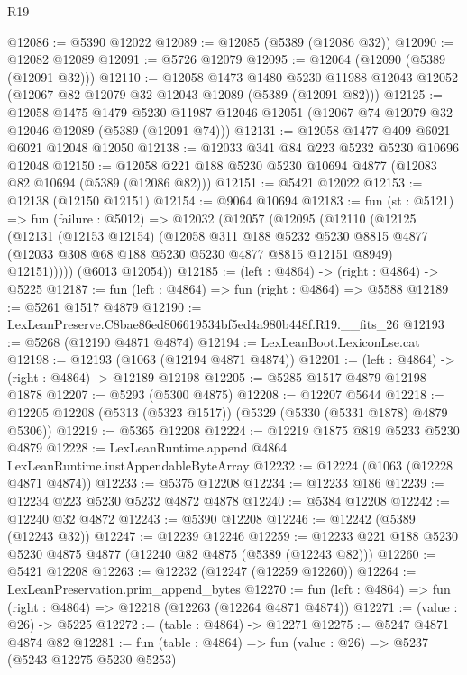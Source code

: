 \begin{lexlean}{R19}
\begin{coremodule}
@12086 := @5390 @12022
@12089 := @12085 (@5389 (@12086 @32))
@12090 := @12082 @12089
@12091 := @5726 @12079
@12095 := @12064 (@12090 (@5389 (@12091 @32)))
@12110 := @12058
    @1473
    @1480
    @5230
    @11988
    @12043
    @12052
    (@12067 @82 @12079 @32 @12043 @12089 (@5389 (@12091 @82)))
@12125 := @12058
    @1475
    @1479
    @5230
    @11987
    @12046
    @12051
    (@12067 @74 @12079 @32 @12046 @12089 (@5389 (@12091 @74)))
@12131 := @12058 @1477 @409 @6021 @6021 @12048 @12050
@12138 := @12033 @341 @84 @223 @5232 @5230 @10696 @12048
@12150 := @12058 @221 @188 @5230 @5230 @10694 @4877 (@12083 @82 @10694 (@5389 (@12086 @82)))
@12151 := @5421 @12022
@12153 := @12138 (@12150 @12151)
@12154 := @9064 @10694
@12183 := fun (st : @5121) =>
  fun (failure : @5012) =>
  @12032
    (@12057
      (@12095
        (@12110
          (@12125
            (@12131
              (@12153 @12154)
              (@12058
                @311
                @188
                @5232
                @5230
                @8815
                @4877
                (@12033 @308 @68 @188 @5230 @5230 @4877 @8815 @12151 @8949)
                @12151)))))
      (@6013 @12054))
@12185 := (left : @4864) -> (right : @4864) -> @5225
@12187 := fun (left : @4864) => fun (right : @4864) => @5588
@12189 := @5261 @1517 @4879
@12190 := LexLeanPreserve.C8bae86ed806619534bf5ed4a980b448f.R19.__fits_26
@12193 := @5268 (@12190 @4871 @4874)
@12194 := LexLeanBoot.LexiconLse.cat
@12198 := @12193 (@1063 (@12194 @4871 @4874))
@12201 := (left : @4864) -> (right : @4864) -> @12189 @12198
@12205 := @5285 @1517 @4879 @12198 @1878
@12207 := @5293 (@5300 @4875)
@12208 := @12207 @5644
@12218 := @12205 @12208 (@5313 (@5323 @1517)) (@5329 (@5330 (@5331 @1878) @4879 @5306))
@12219 := @5365 @12208
@12224 := @12219 @1875 @819 @5233 @5230 @4879
@12228 := LexLeanRuntime.append @4864 LexLeanRuntime.instAppendableByteArray
@12232 := @12224 (@1063 (@12228 @4871 @4874))
@12233 := @5375 @12208
@12234 := @12233 @186
@12239 := @12234 @223 @5230 @5232 @4872 @4878
@12240 := @5384 @12208
@12242 := @12240 @32 @4872
@12243 := @5390 @12208
@12246 := @12242 (@5389 (@12243 @32))
@12247 := @12239 @12246
@12259 := @12233 @221 @188 @5230 @5230 @4875 @4877 (@12240 @82 @4875 (@5389 (@12243 @82)))
@12260 := @5421 @12208
@12263 := @12232 (@12247 (@12259 @12260))
@12264 := LexLeanPreservation.prim_append_bytes
@12270 := fun (left : @4864) => fun (right : @4864) => @12218 (@12263 (@12264 @4871 @4874))
@12271 := (value : @26) -> @5225
@12272 := (table : @4864) -> @12271
@12275 := @5247 @4871 @4874 @82
@12281 := fun (table : @4864) => fun (value : @26) => @5237 (@5243 @12275 @5230 @5253)

\end{coremodule}
\end{lexlean}
